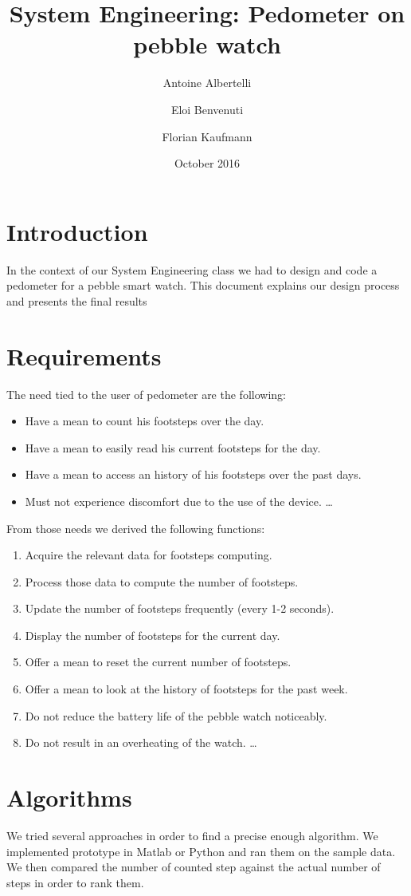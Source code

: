 \documentclass[12pt,twoside,a4paper]{article}
\title{System Engineering: Pedometer on pebble watch}
\author{Antoine Albertelli \and Eloi Benvenuti \and Florian Kaufmann}
\date{October 2016}
\begin{document}
\maketitle

\tableofcontents

\newpage

\section{Introduction}
In the context of our System Engineering class we had to design and code a pedometer for a pebble smart	watch. This document explains our design process and presents the final results
\section{Requirements}
The need tied to the user of pedometer are the following:
\begin{itemize}
	\item Have a mean to count his footsteps over the day.
	\item Have a mean to easily read his current footsteps for the day.
	\item Have a mean to access an history of his footsteps over the past days.
	\item Must not experience discomfort due to the use of the device.  \ldots
\end{itemize}

From those needs we derived the following functions:
\begin{enumerate}
	\item Acquire the relevant data for footsteps computing.
	\item Process those data to compute the number of footsteps.
	\item Update the number of footsteps frequently (every 1-2 seconds).
	\item Display the number of footsteps for the current day.
	\item Offer a mean to reset the current number of footsteps.
	\item Offer a mean to look at the history of footsteps for the past week.
	\item Do not reduce the battery life of the pebble watch noticeably.
	\item Do not result in an overheating of the watch. \ldots
\end{enumerate}

\section{Algorithms}
We tried several approaches in order to find a precise enough algorithm. We implemented prototype in Matlab or Python and ran them on the sample data. We then compared the number of counted step against the actual number of steps in order to rank them.
\end{document}
